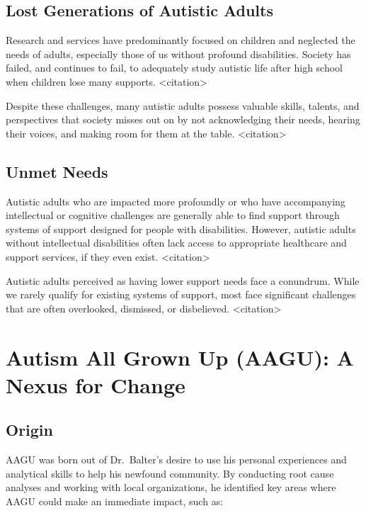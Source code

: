 \documentclass[
  letterpaper,
  DIV=11,
  numbers=noendperiod]{scrreprt}
\begin{document}
\section{Lost Generations of Autistic
Adults}\label{sec-autism2024_lost_gen}

Research and services have predominantly focused on children and
neglected the needs of adults, especially those of us without profound
disabilities. Society has failed, and continues to fail, to adequately
study autistic life after high school when children lose many supports.
\textless citation\textgreater{}

Despite these challenges, many autistic adults possess valuable skills,
talents, and perspectives that society misses out on by not
acknowledging their needs, hearing their voices, and making room for
them at the table. \textless citation\textgreater{}

\section{Unmet Needs}\label{unmet-needs}

Autistic adults who are impacted more profoundly or who have
accompanying intellectual or cognitive challenges are generally able to
find support through systems of support designed for people with
disabilities. However, autistic adults without intellectual disabilities
often lack access to appropriate healthcare and support services, if
they even exist. \textless citation\textgreater{}

Autistic adults perceived as having lower support needs face a
conundrum. While we rarely qualify for existing systems of support, most
face significant challenges that are often overlooked, dismissed, or
disbelieved. \textless citation\textgreater{}


\chapter{Autism All Grown Up (AAGU): A Nexus for Change}\label{sec-aagu}

\section{Origin}\label{sec-aagu_origin}

AAGU was born out of Dr.~Balter's desire to use his personal experiences
and analytical skills to help his newfound community. By conducting root
cause analyses and working with local organizations, he identified key
areas where AAGU could make an immediate impact, such as:
\end{document}
